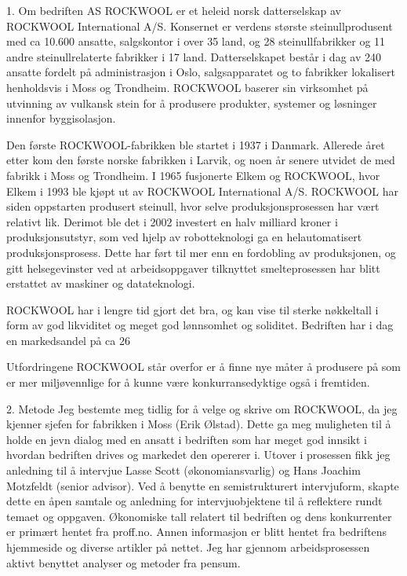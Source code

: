 
1. Om bedriften
AS ROCKWOOL er et heleid norsk datterselskap av ROCKWOOL International A/S. Konsernet er verdens største steinullprodusent med ca 10.600 ansatte, salgskontor i over 35 land, og 28 steinullfabrikker og 11 andre steinullrelaterte fabrikker i 17 land. Datterselskapet består i dag av 240 ansatte fordelt på administrasjon i Oslo, salgsapparatet og to fabrikker lokalisert henholdsvis i Moss og Trondheim. ROCKWOOL baserer sin virksomhet på utvinning av vulkansk stein for å produsere produkter, systemer og løsninger innenfor byggisolasjon.

Den første ROCKWOOL-fabrikken ble startet i 1937 i Danmark. Allerede året etter kom den første norske fabrikken i Larvik, og noen år senere utvidet de med fabrikk i Moss og Trondheim. I 1965 fusjonerte Elkem og ROCKWOOL, hvor Elkem i 1993 ble kjøpt ut av ROCKWOOL International A/S. ROCKWOOL har siden oppstarten produsert steinull, hvor selve produksjonsprosessen har vært relativt lik. Derimot ble det i 2002 investert en halv milliard kroner i produksjonsutstyr, som ved hjelp av robotteknologi ga en helautomatisert produksjonsprosess. Dette har ført til mer enn en fordobling av produksjonen, og gitt helsegevinster ved at arbeidsoppgaver tilknyttet smelteprosessen har blitt erstattet av maskiner og datateknologi.

ROCKWOOL har i lengre tid gjort det bra, og kan vise til sterke nøkkeltall i form av god likviditet og meget god lønnsomhet og soliditet. Bedriften har i dag en markedsandel på ca 26%

Utfordringene ROCKWOOL står overfor er å finne nye måter å produsere på som er mer miljøvennlige for å kunne være konkurransedyktige også i fremtiden.

2. Metode
Jeg bestemte meg tidlig for å velge og skrive om ROCKWOOL, da jeg kjenner sjefen for fabrikken i Moss (Erik Ølstad). Dette ga meg muligheten til å holde en jevn dialog med en ansatt i bedriften som har meget god innsikt i hvordan bedriften drives og markedet den opererer i. Utover i prosessen fikk jeg anledning til å intervjue Lasse Scott (økonomiansvarlig) og Hans Joachim Motzfeldt (senior advisor). Ved å benytte en semistrukturert intervjuform, skapte dette en åpen samtale og anledning for intervjuobjektene til å reflektere rundt temaet og oppgaven. Økonomiske tall relatert til bedriften og dens konkurrenter er primært hentet fra proff.no. Annen informasjon er blitt hentet fra bedriftens hjemmeside og diverse artikler på nettet. Jeg har gjennom arbeidsprosessen aktivt benyttet analyser og metoder fra pensum.

